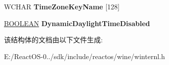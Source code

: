 \begin{DoxyCompactItemize}
\mbox{\label{struct___r_t_l___t_i_m_e___d_y_n_a_m_i_c___z_o_n_e___i_n_f_o_r_m_a_t_i_o_n_a0f7fbd4a81d64bd98724e84d84f98edc}} 
W\+C\+H\+AR {\bfseries Time\+Zone\+Key\+Name} \mbox{[}128\mbox{]}
\item 
\mbox{\label{struct___r_t_l___t_i_m_e___d_y_n_a_m_i_c___z_o_n_e___i_n_f_o_r_m_a_t_i_o_n_ab3415477cebab4f9bca64cf06122eb36}} 
\hyperlink{_processor_bind_8h_a112e3146cb38b6ee95e64d85842e380a}{B\+O\+O\+L\+E\+AN} {\bfseries Dynamic\+Daylight\+Time\+Disabled}
\end{DoxyCompactItemize}


该结构体的文档由以下文件生成\+:\begin{DoxyCompactItemize}
\item 
E\+:/\+React\+O\+S-\/0../sdk/include/reactos/wine/winternl.\+h\end{DoxyCompactItemize}
